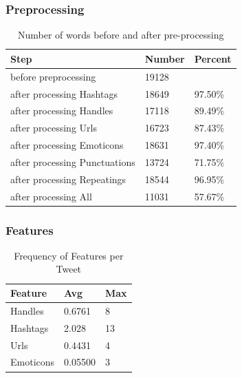 \documentclass{beamer}
\begin{document}

\begin{frame}
\frametitle{Preprocessing}
\begin{table}[h]
\centering
	\begin{tabular}{ l l l }
	\toprule
	\textbf{Step} & \textbf{Number} & \textbf{Percent}	\\
	\midrule
	before preprocessing & 19128 & \\
	\midrule
	after processing Hashtags & 18649 & 97.50\% \\
	after processing Handles & 17118 & 89.49\% \\
	after processing Urls & 16723 & 87.43\% \\
	after processing Emoticons & 18631 & 97.40\% \\
	after processing Punctuations & 13724 & 71.75\% \\
	after processing Repeatings & 18544 & 96.95\% \\
	\bottomrule
	after processing All & 11031 & 57.67\% \\
	\bottomrule
	\end{tabular}
\caption{Number of words before and after pre-processing}
\label{table:preproc_numwords}
\end{table}
\end{frame}


\begin{frame}
\frametitle{Features}

\begin{table}[h]
\centering
	\begin{tabular}{ l l l }
	\toprule
	\textbf{Feature    }& \textbf{Avg }& \textbf{Max }\\
	\midrule
	Handles    & 0.6761 & 8 \\
	Hashtags   & 2.028 & 13 \\
	Urls       & 0.4431 & 4 \\
	Emoticons  & 0.05500 & 3 \\
	\bottomrule
	\end{tabular}
\caption{Frequency of Features per Tweet}
\label{table:preproc_freq}
\end{table}

\end{frame}

\end{document}
